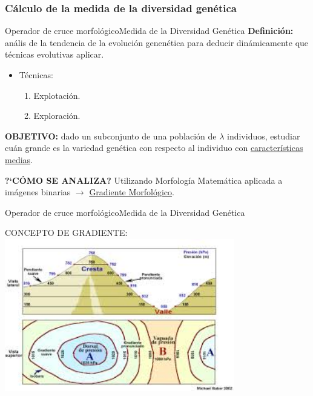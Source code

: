 \documentclass[10pt]{beamer}
\begin{document}
\subsubsection{Cálculo de la medida de la diversidad genética}

\begin{frame}{Operador de cruce morfol\'ogico}{Medida de la Diversidad Gen\'etica}
	\textbf{Definici\'on:} an\'alis de la tendencia de la evoluci\'on genen\'etica para deducir din\'amicamente que t\'ecnicas evolutivas aplicar.
	
	\begin{itemize}
		\item T\'ecnicas:
		\begin{enumerate}
			\item Explotaci\'on.
			\item Exploraci\'on.
		\end{enumerate}
	\end{itemize}
	
	\textbf{OBJETIVO:} dado un subconjunto de una poblaci\'on de $\lambda$ individuos, estudiar cu\'an grande es la variedad gen\'etica con respecto al individuo con \underline{caracter\'isticas medias}.
	
	\textbf{?`C\'OMO SE ANALIZA?} Utilizando Morfolog\'ia Matem\'atica aplicada a im\'agenes binarias $\rightarrow$  \underline{Gradiente Morfol\'ogico}.
	
\end{frame}

\begin{frame}{Operador de cruce morfol\'ogico}{Medida de la Diversidad Gen\'etica}
	\begin{center}
		CONCEPTO DE GRADIENTE:
		\includegraphics[width=10cm]{gradiente_altura}
	\end{center}
\end{frame}
\end{document}

